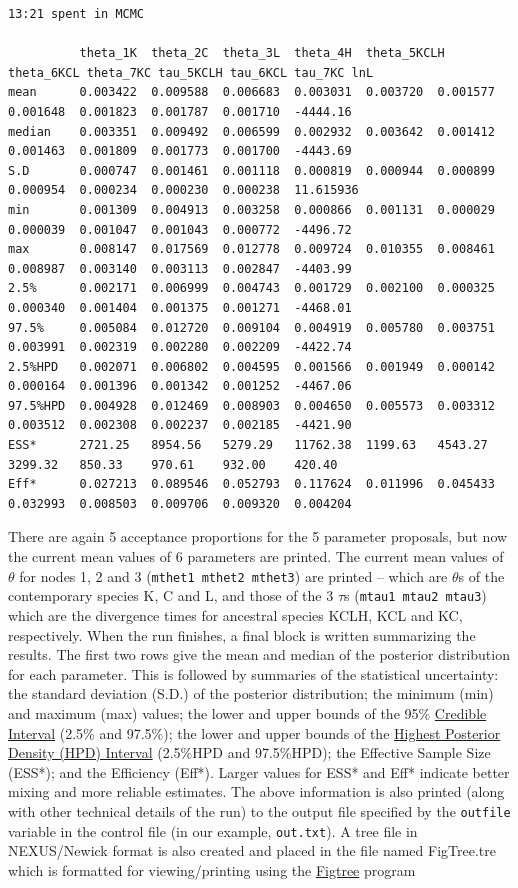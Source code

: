 \documentclass[a4paper]{book}
\numberwithin{equation}{section} \renewcommand{\baselinestretch}{0.55}
\begin{document}
{\begin{verbatim}
13:21 spent in MCMC

          theta_1K  theta_2C  theta_3L	theta_4H  theta_5KCLH theta_6KCL theta_7KC tau_5KCLH tau_6KCL tau_7KC lnL
mean      0.003422  0.009588  0.006683  0.003031  0.003720  0.001577  0.001648  0.001823  0.001787  0.001710  -4444.16
median    0.003351  0.009492  0.006599  0.002932  0.003642  0.001412  0.001463  0.001809  0.001773  0.001700  -4443.69
S.D       0.000747  0.001461  0.001118  0.000819  0.000944  0.000899  0.000954  0.000234  0.000230  0.000238  11.615936
min       0.001309  0.004913  0.003258  0.000866  0.001131  0.000029  0.000039  0.001047  0.001043  0.000772  -4496.72
max       0.008147  0.017569  0.012778  0.009724  0.010355  0.008461  0.008987  0.003140  0.003113  0.002847  -4403.99
2.5%      0.002171  0.006999  0.004743  0.001729  0.002100  0.000325  0.000340  0.001404  0.001375  0.001271  -4468.01
97.5%     0.005084  0.012720  0.009104  0.004919  0.005780  0.003751  0.003991  0.002319  0.002280  0.002209  -4422.74
2.5%HPD   0.002071  0.006802  0.004595  0.001566  0.001949  0.000142  0.000164  0.001396  0.001342  0.001252  -4467.06
97.5%HPD  0.004928  0.012469  0.008903  0.004650  0.005573  0.003312  0.003512  0.002308  0.002237  0.002185  -4421.90
ESS*      2721.25   8954.56   5279.29   11762.38  1199.63   4543.27   3299.32   850.33    970.61    932.00    420.40
Eff*      0.027213  0.089546  0.052793  0.117624  0.011996  0.045433  0.032993  0.008503  0.009706  0.009320  0.004204

\end{verbatim}
  }
There are again 5 acceptance proportions for the 5 parameter proposals, but now the current mean values of 6
parameters are printed. The current mean values of $\theta$ for nodes 1, 2 and 3 (\texttt{mthet1 mthet2 mthet3})
are printed -- which are $\theta$s of the contemporary species K, C and L, and those of
the 3 $\tau$s (\texttt{mtau1  mtau2  mtau3}) which are the divergence times for ancestral species
KCLH, KCL and KC, respectively. When the run finishes, a final block is written summarizing the results. The first two
rows give the mean and median of the posterior distribution for each parameter. This is followed by
summaries of the statistical uncertainty: the standard deviation (S.D.) of the posterior distribution;
the minimum (min) and maximum (max) values; the lower and upper bounds of the 95\%
\href{https://en.wikipedia.org/wiki/Credible_interval}{Credible Interval} (2.5\% and 97.5\%);
the lower and upper bounds of the \href{https://en.wikipedia.org/wiki/Credible_interval}{Highest Posterior Density (HPD) Interval} (2.5\%HPD and 97.5\%HPD);
the Effective Sample Size (ESS*); and the Efficiency (Eff*). Larger values for ESS* and Eff* indicate better
mixing and more reliable estimates.
The above information is also printed (along with other technical details of the run)
to the output file specified by the \texttt{outfile} variable in the control file (in our example, \texttt{out.txt}).
A tree file in NEXUS/Newick format is also created and placed in the file named FigTree.tre which is formatted
for viewing/printing using the \href{http://tree.bio.ed.ac.uk/software/figtree/}{Figtree} program
\end{document}
